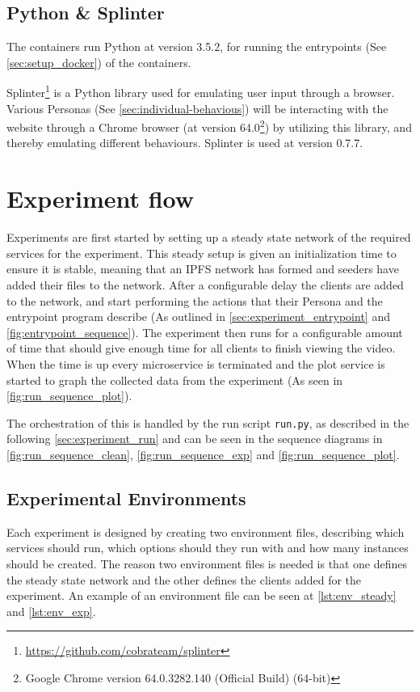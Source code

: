 \subsection{Python \& Splinter}
\label{sec:setup_python}
\label{sec:setup_splinter}
The containers run Python at version 3.5.2, for running the entrypoints (See \autoref{sec:setup_docker}) of the containers.

Splinter\footnote{\url{https://github.com/cobrateam/splinter}} is a Python library used for emulating user input through a browser. Various Personas (See \autoref{sec:individual-behavious}) will be interacting with the website through a Chrome browser (at version 64.0\footnote{Google Chrome version 64.0.3282.140 (Official Build) (64-bit)}) by utilizing this library, and thereby emulating different behaviours.
Splinter is used at version 0.7.7.


\section{Experiment flow}
\label{sec:impl-flow}
Experiments are first started by setting up a steady state network of the required services for the experiment. This steady setup is given an initialization time to ensure it is stable, meaning that an \ac{IPFS} network has formed and seeders have added their files to the network.
After a configurable delay the clients are added to the network, and start performing the actions that their Persona and the entrypoint program describe (As outlined in \autoref{sec:experiment_entrypoint} and \autoref{fig:entrypoint_sequence}).
The experiment then runs for a configurable amount of time that should give enough time for all clients to finish viewing the video. When the time is up every microservice is terminated and the plot service is started to graph the collected data from the experiment (As seen in \autoref{fig:run_sequence_plot}).

The orchestration of this is handled by the run script \texttt{run.py}, as described in the following \autoref{sec:experiment_run} and can be seen in the sequence diagrams in \autoref{fig:run_sequence_clean}, \ref{fig:run_sequence_exp} and \ref{fig:run_sequence_plot}.

\subsection{Experimental Environments}
\label{sec:experiment_env}
Each experiment is designed by creating two environment files, describing which services should run, which options should they run with and how many instances should be created. The reason two environment files is needed is that one defines the steady state network and the other defines the clients added for the experiment. An example of an environment file can be seen at \autoref{lst:env_steady} and \ref{lst:env_exp}.

